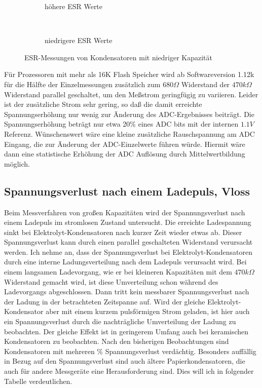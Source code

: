 \begin{figure}[H]
  \begin{subfigure}[b]{9cm}
    \centering
    \resizebox{9cm}{!}{}
    \caption{höhere ESR Werte}
  \end{subfigure}
  ~
  \begin{subfigure}[b]{9cm}
    \centering
    \resizebox{9cm}{!}{}
    \caption{niedrigere ESR Werte}
  \end{subfigure}
  \caption{ESR-Messungen von Kondensatoren mit niedriger Kapazität}
  \label{pic:Cesr_22n}
\end{figure}
 
Für Prozessoren mit mehr als 16K Flash Speicher wird ab Softwareversion 1.12k für die Hälfte der Einzelmessungen
zusätzlich zum \(680\Omega\) Widerstand der \(470k\Omega\) Widerstand parallel geschaltet, um den Meßstrom geringfügig zu variieren.
Leider ist der zusätzliche Strom sehr gering, so daß die damit erreichte Spannungserhöhung nur wenig zur Änderung
des ADC-Ergebnisses beiträgt.
Die Spannungserhöhung beträgt nur etwa 20\% eines ADC bits mit der internen \(1.1V\) Referenz.
Wünschenswert wäre eine kleine zusätzliche Rauschspannung am ADC Eingang, die zur Änderung der ADC-Einzelwerte führen würde.
Hiermit wäre dann eine statistische Erhöhung der ADC Auflösung durch Mittelwertbildung möglich. 


\subsection{Spannungsverlust nach einem Ladepuls, Vloss}
Beim Messverfahren von großen Kapazitäten wird der Spannungsverlust nach einem Ladepuls im stromlosen Zustand untersucht.
Die erreichte Ladespannung sinkt bei Elektrolyt-Kondensatoren nach kurzer Zeit wieder etwas ab.
Dieser Spannungsverlust kann durch einen parallel geschalteten Widerstand verursacht werden.
Ich nehme an, dass der Spannungsverlust bei Elektrolyt-Kondensatoren durch eine interne Ladungsverteilung nach
dem Ladepuls verursacht wird. Bei einem langsamen Ladevorgang, wie er bei kleineren Kapazitäten mit dem \(470k\Omega\) Widerstand
gemacht wird, ist diese Umverteilung schon während des Ladevorgangs abgeschlossen. Dann tritt kein messbarer Spannungsverlust nach
der Ladung in der betrachteten Zeitspanne auf. Wird der gleiche Elektrolyt-Kondensator aber mit einem
kurzem pulsförmigen Strom geladen, ist hier auch ein Spannungsverlust durch die nachträgliche Umverteilung
der Ladung zu beobachten. Der gleiche Effekt ist in geringerem Umfang auch bei keramischen Kondensatoren zu beobachten. 
Nach den bisherigen Beobachtungen sind Kondensatoren mit mehreren \% Spannungsverlust verdächtig.
Besonders auffällig in Bezug auf den Spannungsverlust sind auch ältere Papierkondensatoren, die auch für andere Messgeräte
eine Herausforderung sind. Dies will ich in folgender Tabelle verdeutlichen.
\vspace{0.5 cm}

